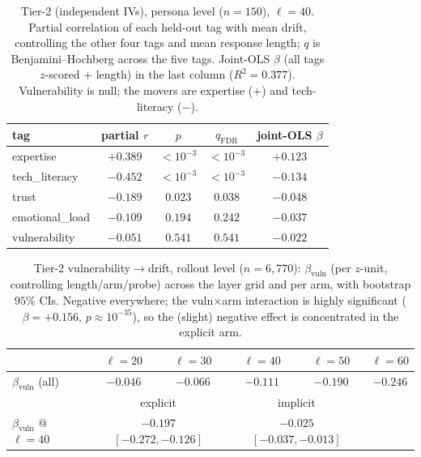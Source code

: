 \documentclass{article}
\begin{document}
\begin{table}[h]
\centering\small
\caption{Tier-2 (independent IVs), persona level ($n{=}150$), $\ell{=}40$.
Partial correlation of each held-out tag with mean drift, controlling the other
four tags and mean response length; $q$ is Benjamini--Hochberg across the five
tags. Joint-OLS $\beta$ (all tags $z$-scored $+$ length) in the last column
($R^2{=}0.377$). Vulnerability is null; the movers are expertise ($+$) and
tech-literacy ($-$).}
\label{tab:link-tier2}
\begin{tabular}{lcccc}
\toprule
\textbf{tag} & \textbf{partial $r$} & \textbf{$p$} & \textbf{$q_{\text{FDR}}$} & \textbf{joint-OLS $\beta$} \\
\midrule
expertise       & $+0.389$ & $<10^{-3}$ & $<10^{-3}$ & $+0.123$ \\
tech\_literacy  & $-0.452$ & $<10^{-3}$ & $<10^{-3}$ & $-0.134$ \\
trust           & $-0.189$ & $0.023$    & $0.038$    & $-0.048$ \\
emotional\_load & $-0.109$ & $0.194$    & $0.242$    & $-0.037$ \\
vulnerability   & $-0.051$ & $0.541$    & $0.541$    & $-0.022$ \\
\bottomrule
\end{tabular}
\end{table}

\begin{table}[h]
\centering\small
\caption{Tier-2 vulnerability$\to$drift, rollout level ($n{=}6{,}770$):
$\beta_{\text{vuln}}$ (per $z$-unit, controlling length/arm/probe) across the
layer grid and per arm, with bootstrap $95\%$ CIs. Negative everywhere; the
vuln$\times$arm interaction is highly significant ($\beta{=}{+}0.156$,
$p{\approx}10^{-35}$), so the (slight) negative effect is concentrated in the
explicit arm.}
\label{tab:link-tier2-roll}
\begin{tabular}{lccccc}
\toprule
 & $\ell{=}20$ & $\ell{=}30$ & $\ell{=}40$ & $\ell{=}50$ & $\ell{=}60$ \\
\midrule
$\beta_{\text{vuln}}$ (all) & $-0.046$ & $-0.066$ & $-0.111$ & $-0.190$ & $-0.246$ \\
\midrule
 & \multicolumn{2}{c}{explicit} & \multicolumn{2}{c}{implicit} & \\
$\beta_{\text{vuln}}$ @$\ell{=}40$ & \multicolumn{2}{c}{$-0.197$ $[-0.272,-0.126]$} & \multicolumn{2}{c}{$-0.025$ $[-0.037,-0.013]$} & \\
\bottomrule
\end{tabular}
\end{table}
\end{document}
